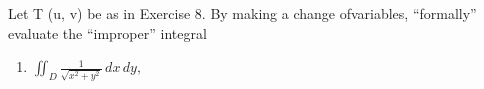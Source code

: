Let T (u, v) be as in Exercise 8. By making a change ofvariables, “formally” evaluate the “improper” integral
\begin{enumerate}[label=(\alph*), itemsep=0.4em, topsep=0.5em]
	\item $\displaystyle \iint_D \frac{1}{\sqrt{x^2 + y^2}} \, dx \, dy,$
\end{enumerate}
